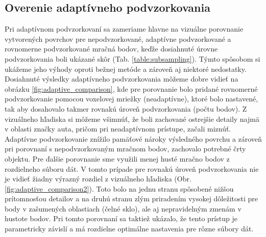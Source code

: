 \subsection{Overenie adaptívneho podvzorkovania}
\noindent Pri adaptívnom podvzorkovaní sa zameriame hlavne na vizuálne porovnanie vytvorených povrchov pre nepodvzorkované, adaptívne podvzorkované a rovnomerne podvzorkované mračná bodov, keďže dosiahnuté úrovne podvzorkovania boli ukázané skôr (Tab. \ref{table:subsampling}). Týmto spôsobom si ukážeme jeho výhody oproti bežnej metóde a zároveň aj niektoré nedostatky.
\newline\indent Dosiahnuté výsledky adaptívneho podvzorkovania môžeme dobre vidieť na obrázku \ref{fig:adaptive_comparison}, kde pre porovnanie bolo pridané rovnomerné podvzorkovanie pomocou voxelovej mriežky (neadaptívne), ktoré bolo nastavené, tak aby dosahovalo takmer rovnakú úroveň podvzorkovania (počtu bodov). Z vizuálneho hľadiska si môžeme všimnúť, že boli zachované ostrejšie detaily najmä v oblasti značky auta, pričom pri neadaptívnom prístupe, začali miznúť. Adaptívne podvzorkovanie znížilo pamäťové nároky výsledného povrchu a zároveň pri porovnaní s nepodvzorkovaným mračnom bodov, zachovalo potrebné črty objektu.
\newline\indent Pre ďalšie porovnanie sme využili menej husté mračno bodov z rozdielneho súboru dát. V tomto prípade pre rovnakú úroveň podvzorkovania nie je vidieť žiadny výrazný rozdiel z vizuálneho hľadiska (Obr. \ref{fig:adaptive_comparison2}). Toto bolo na jednu stranu spôsobené nižšou prítomnosťou detailov a na druhú stranu zlým priradením vysokej dôležitosti pre body v zašumených oblastiach (čelné sklo), ale aj nepravidelným zmenám v hustote bodov. Pri tomto porovnaní sa taktiež ukázalo, že tento prístup je parametricky závislí a má rozdielne optimálne nastavenia pre rôzne súbory dát.

